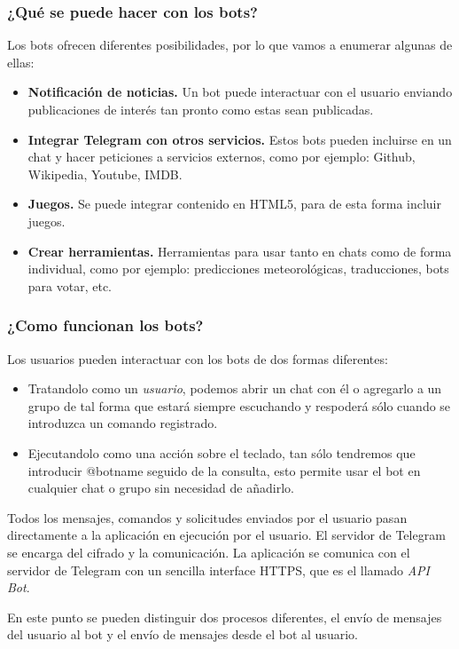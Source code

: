 \documentclass[10pt,journal,compsoc]{IEEEtran}
\begin{document}
\subsubsection{¿Qué se puede hacer con los bots?}
Los bots ofrecen diferentes posibilidades, por lo que vamos a enumerar algunas 
de ellas:
\begin{itemize}
  \item \textbf{Notificación de noticias.} Un bot puede interactuar con el 
  usuario enviando publicaciones de interés tan pronto como estas sean 
  publicadas.
  \item \textbf{Integrar Telegram con otros servicios.} Estos bots pueden 
  incluirse en un chat y hacer peticiones a servicios externos, como por 
  ejemplo: Github, Wikipedia, Youtube, IMDB.
  \item \textbf{Juegos.} Se puede integrar contenido en HTML5, para de esta 
  forma incluir juegos.
  \item \textbf{Crear herramientas.} Herramientas para usar tanto en chats como 
  de forma individual, como por ejemplo: predicciones meteorológicas, 
  traducciones, bots para votar, etc.
\end{itemize}

\subsubsection{¿Como funcionan los bots?}
Los usuarios pueden interactuar con los bots de dos formas diferentes:
\begin{itemize}
  \item Tratandolo como un \textit{usuario}, podemos abrir un chat con él o agregarlo a un grupo de tal
  forma que estará siempre escuchando y respoderá sólo cuando se introduzca un comando registrado.
  \item Ejecutandolo como una acción sobre el teclado, tan sólo tendremos que 
  introducir @botname seguido de la consulta, esto permite usar el bot en 
  cualquier chat o grupo sin necesidad de añadirlo.
\end{itemize}

Todos los mensajes, comandos y solicitudes enviados por el usuario pasan 
directamente a la aplicación en ejecución por el usuario. El servidor de 
Telegram se encarga del cifrado y la comunicación. La aplicación se comunica con 
el servidor de Telegram con un sencilla interface HTTPS, que es el llamado \textit{API 
Bot}.

En este punto se pueden distinguir dos procesos diferentes, el envío de mensajes 
del usuario al bot y el envío de mensajes desde el bot al usuario.
\end{document}
